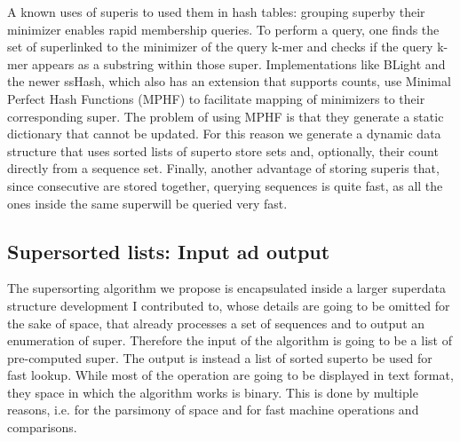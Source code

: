A known uses of super\kmers is to used them in hash tables: grouping super\kmers by their minimizer enables rapid membership queries. To perform a query, one finds the set of super\kmer linked to the minimizer of the query k-mer and checks if the query k-mer appears as a substring within those super\kmer. Implementations like BLight and the newer ssHash, which also has an extension that supports \kmer counts, use Minimal Perfect Hash Functions (MPHF) to facilitate mapping of minimizers to their corresponding super\kmers. The problem of using MPHF is that they generate a static dictionary that cannot be updated. For this reason we generate a dynamic data structure that uses sorted lists of super\kmers to store \kmer sets and, optionally, their count directly from a sequence set.
Finally, another advantage of storing super\kmers is that, since consecutive \kmers are stored together, querying sequences is quite fast, as all the ones inside the same super\kmer will be queried very fast.

\subsection{Super\kmer sorted lists: Input ad output}
The super\kmer sorting algorithm we propose is encapsulated inside a larger super\kmer data structure development I contributed to, whose details are going to be omitted for the sake of space, that already processes a set of sequences and to output an enumeration of super\kmers. Therefore the input of the algorithm is going to be a list of pre-computed super\kmers. The output is instead a list of sorted super\kmers to be used for fast lookup. While most of the operation are going to be displayed in text format, they space in which the algorithm works is binary. This is done by multiple reasons, i.e. for the parsimony of space and for fast machine operations and comparisons.

